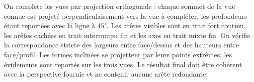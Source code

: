 \begin{corrigebox}
On complète les vues par projection orthogonale : chaque sommet de la
        vue connue est projeté perpendiculairement vers la vue à compléter, les
        profondeurs étant reportées avec la ligne à $45^\circ$. Les arêtes visibles sont en
        trait fort continu, les arêtes cachées en trait interrompu fin et les axes en trait
        mixte fin. On vérifie la correspondance stricte des largeurs entre face/dessus et
        des hauteurs entre face/profil. Les formes inclinées se projettent par leurs points
        extrêmes; les évidements sont reportés sur les trois vues. Le résultat final doit
        être cohérent avec la perspective fournie et ne contenir aucune arête redondante.
\end{corrigebox}
